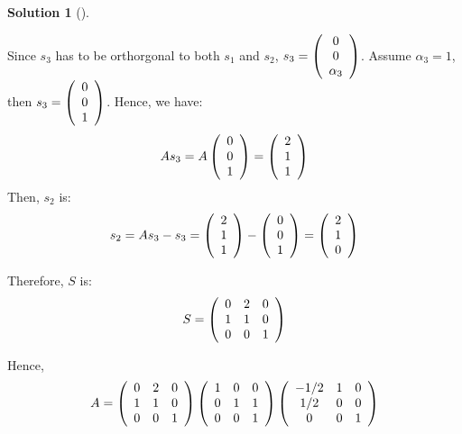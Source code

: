 \documentclass[numbers=enddot,12pt,final,onecolumn,notitlepage]{scrartcl}
\newcounter{sol}
\theoremstyle{definition}
\newtheorem{solu}[sol]{Solution}
\newenvironment{solution}[1][]
{\begin{solu}[#1]\begin{leftbar}}
        {\end{leftbar}\end{solu}}
\begin{document}
\begin{solution}
	Since $s_3$ has to be orthorgonal to both $s_1$ and $s_2$, $s_3 =
		\left(\begin{array}
				[c]{c}
				0 \\
				0 \\
				\alpha_3
			\end{array}\right)$. Assume $\alpha_3 = 1$, then $s_3 =
		\left(\begin{array}
				[c]{c}
				0 \\
				0 \\
				1
			\end{array}\right)$.
	Hence, we have:
	\[
		As_3 = A\left(\begin{array}
				[c]{c}
				0 \\
				0 \\
				1
			\end{array}\right) =
		\left(\begin{array}
				[c]{c}
				2 \\
				1 \\
				1
			\end{array}\right)
	\]
	Then, $s_2$ is:
	\[
		s_2 = As_3 - s_3 =
		\left(\begin{array}
				[c]{c}
				2 \\
				1 \\
				1
			\end{array}\right) -
		\left(\begin{array}
				[c]{c}
				0 \\
				0 \\
				1
			\end{array}\right) =
		\left(\begin{array}
				[c]{c}
				2 \\
				1 \\
				0
			\end{array}\right)
	\]

	Therefore, $S$ is:
	\[
		S = \left(\begin{array}
				[c]{ccc}
				0 & 2 & 0 \\
				1 & 1 & 0 \\
				0 & 0 & 1
			\end{array}\right)
	\]

	Hence,
	\[
		A = \left(\begin{array}
				[c]{ccc}
				0 & 2 & 0 \\
				1 & 1 & 0 \\
				0 & 0 & 1
			\end{array}\right)
		\left(\begin{array}
				[c]{ccc}
				1 & 0 & 0 \\
				0 & 1 & 1 \\
				0 & 0 & 1
			\end{array}\right)
		\left(\begin{array}
				[c]{ccc}
				-1/2 & 1 & 0 \\
				1/2  & 0 & 0 \\
				0    & 0 & 1
			\end{array}\right)
	\]


\end{solution}
\end{document}

